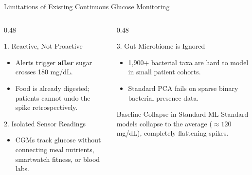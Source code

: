 \documentclass[aspectratio=169, 10pt]{beamer}
\begin{document}
\begin{frame}{Limitations of Existing Continuous Glucose Monitoring}
  \begin{columns}[c]
    \begin{column}{0.48\textwidth}
      \begin{block}{1. Reactive, Not Proactive}
        \begin{itemize}\setlength{\itemsep}{0.4em}
          \item Alerts trigger \textbf{after} sugar crosses 180 mg/dL.
          \item Food is already digested; patients cannot undo the spike retrospectively.
        \end{itemize}
      \end{block}
      
      \vspace{0.2cm}
      \begin{block}{2. Isolated Sensor Readings}
        \begin{itemize}\setlength{\itemsep}{0.4em}
          \item CGMs track glucose without connecting meal nutrients, smartwatch fitness, or blood labs.
        \end{itemize}
      \end{block}
    \end{column}
    
    \begin{column}{0.48\textwidth}
      \begin{block}{3. Gut Microbiome is Ignored}
        \begin{itemize}\setlength{\itemsep}{0.4em}
          \item 1,900+ bacterial taxa are hard to model in small patient cohorts.
          \item Standard PCA fails on sparse binary bacterial presence data.
        \end{itemize}
      \end{block}
      
      \vspace{0.2cm}
      \begin{alertblock}{Baseline Collapse in Standard ML}
        Standard models collapse to the average ($\approx 120$ mg/dL), completely flattening spikes.
      \end{alertblock}
    \end{column}
  \end{columns}
\end{frame}
\end{document}
